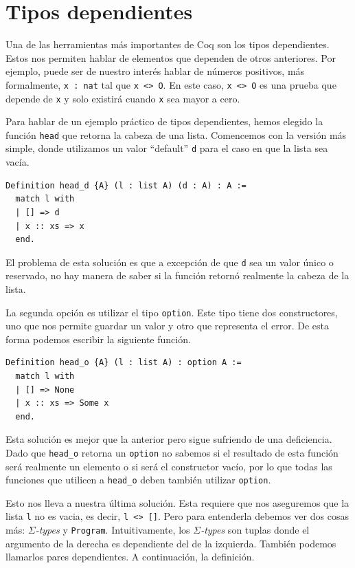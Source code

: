 \section{Tipos dependientes}

Una de las herramientas más importantes de Coq son los tipos dependientes. Estos nos permiten hablar de elementos que dependen de otros anteriores. Por ejemplo, puede ser de nuestro interés hablar de números positivos, más formalmente, \lstinline{x : nat} tal que \lstinline{x <> O}. En este caso, \lstinline{x <> O} es una prueba que depende de \lstinline{x} y solo existirá cuando \lstinline{x} sea mayor a cero.

Para hablar de un ejemplo práctico de tipos dependientes, hemos elegido la función \lstinline{head} que retorna la cabeza de una lista. Comencemos con la versión más simple, donde utilizamos un valor ``default'' \lstinline{d} para el caso en que la lista sea vacía.

\begin{lstlisting}
Definition head_d {A} (l : list A) (d : A) : A :=
  match l with
  | [] => d
  | x :: xs => x
  end.
\end{lstlisting}

El problema de esta solución es que a excepción de que \lstinline{d} sea un valor único o reservado, no hay manera de saber si la función retornó realmente la cabeza de la lista.

La segunda opción es utilizar el tipo \lstinline{option}. Este tipo tiene dos constructores, uno que nos permite guardar un valor y otro que representa el error. De esta forma podemos escribir la siguiente función.

\begin{lstlisting}
Definition head_o {A} (l : list A) : option A :=
  match l with
  | [] => None
  | x :: xs => Some x
  end.
\end{lstlisting}

Esta solución es mejor que la anterior pero sigue sufriendo de una deficiencia. Dado que \lstinline{head_o} retorna un \lstinline{option} no sabemos si el resultado de esta función será realmente un elemento o si será el constructor vacío, por lo que todas las funciones que utilicen a \lstinline{head_o} deben también utilizar \lstinline{option}.

Esto nos lleva a nuestra última solución. Esta requiere que nos aseguremos que la lista \lstinline{l} no es vacia, es decir, \lstinline{l <> []}. Pero para entenderla debemos ver dos cosas más: $\Sigma$\textit{-types} y \lstinline{Program}.
Intuitivamente, los $\Sigma$\textit{-types} son tuplas donde el argumento de la derecha es dependiente del de la izquierda. También podemos llamarlos pares dependientes. A continuación, la definición.

